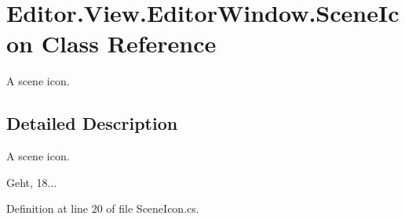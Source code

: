 \section{Editor.\-View.\-Editor\-Window.\-Scene\-Icon Class Reference}
\label{class_editor_1_1_view_1_1_editor_window_1_1_scene_icon}


A scene icon.  




\subsection{Detailed Description}
A scene icon. 

Geht, 18... 

Definition at line 20 of file Scene\-Icon.\-cs.

